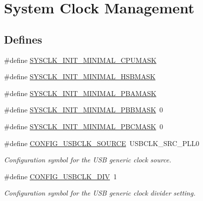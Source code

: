 \hypertarget{group__sysclk__group}{
\section{\-System \-Clock \-Management}
\label{group__sysclk__group}
}
\subsection*{\-Defines}
\begin{DoxyCompactItemize}
\item 
\#define \hyperlink{group__sysclk__group_gabd8c9eaed83f9b71734a80f4b66742b3}{\-S\-Y\-S\-C\-L\-K\-\_\-\-I\-N\-I\-T\-\_\-\-M\-I\-N\-I\-M\-A\-L\-\_\-\-C\-P\-U\-M\-A\-S\-K}
\item 
\#define \hyperlink{group__sysclk__group_ga7bd0214b8ad00652adb81da9b5c1b165}{\-S\-Y\-S\-C\-L\-K\-\_\-\-I\-N\-I\-T\-\_\-\-M\-I\-N\-I\-M\-A\-L\-\_\-\-H\-S\-B\-M\-A\-S\-K}
\item 
\#define \hyperlink{group__sysclk__group_ga25425ac0f90eb3e96a7c303e6707b282}{\-S\-Y\-S\-C\-L\-K\-\_\-\-I\-N\-I\-T\-\_\-\-M\-I\-N\-I\-M\-A\-L\-\_\-\-P\-B\-A\-M\-A\-S\-K}
\item 
\#define \hyperlink{group__sysclk__group_ga02a23ab95f0213faeb009f4411d0a3aa}{\-S\-Y\-S\-C\-L\-K\-\_\-\-I\-N\-I\-T\-\_\-\-M\-I\-N\-I\-M\-A\-L\-\_\-\-P\-B\-B\-M\-A\-S\-K}~0
\item 
\#define \hyperlink{group__sysclk__group_ga5088dc19411a34aad978c46e7ab44525}{\-S\-Y\-S\-C\-L\-K\-\_\-\-I\-N\-I\-T\-\_\-\-M\-I\-N\-I\-M\-A\-L\-\_\-\-P\-B\-C\-M\-A\-S\-K}~0
\item 
\#define \hyperlink{group__sysclk__group_ga2ea7011abd3d43ef751313c6fc8c2068}{\-C\-O\-N\-F\-I\-G\-\_\-\-U\-S\-B\-C\-L\-K\-\_\-\-S\-O\-U\-R\-C\-E}~\-U\-S\-B\-C\-L\-K\-\_\-\-S\-R\-C\-\_\-\-P\-L\-L0
\begin{DoxyCompactList}\small\item\em \-Configuration symbol for the \-U\-S\-B generic clock source. \end{DoxyCompactList}\item 
\#define \hyperlink{group__sysclk__group_gac73a11432c1931f5f2daa030eda13923}{\-C\-O\-N\-F\-I\-G\-\_\-\-U\-S\-B\-C\-L\-K\-\_\-\-D\-I\-V}~1
\begin{DoxyCompactList}\small\item\em \-Configuration symbol for the \-U\-S\-B generic clock divider setting. \end{DoxyCompactList}\end{DoxyCompactItemize}
